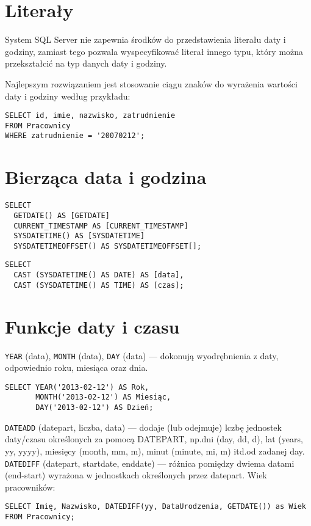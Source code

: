 \documentclass{article}
\begin{document}
\section{Literały}
System SQL Server nie zapewnia środków do przedstawienia literału daty i godziny, zamiast tego pozwala wyspecyfikować literał innego typu, który można przekształcić na typ danych daty i godziny.

Najlepszym rozwiązaniem jest stosowanie ciągu znaków do wyrażenia wartości daty i godziny według przykładu:
\begin{verbatim}
SELECT id, imie, nazwisko, zatrudnienie
FROM Pracownicy
WHERE zatrudnienie = '20070212';
\end{verbatim}

\section{Bierząca data i godzina}

\begin{verbatim}
SELECT
  GETDATE() AS [GETDATE]
  CURRENT_TIMESTAMP AS [CURRENT_TIMESTAMP]
  SYSDATETIME() AS [SYSDATETIME]
  SYSDATETIMEOFFSET() AS SYSDATETIMEOFFSET[];
\end{verbatim}
\begin{verbatim}
SELECT
  CAST (SYSDATETIME() AS DATE) AS [data],
  CAST (SYSDATETIME() AS TIME) AS [czas];
\end{verbatim}

\section{Funkcje daty i czasu}

{\tt YEAR} (data), {\tt MONTH} (data), {\tt DAY} (data) --- dokonują wyodrębnienia z daty, odpowiednio roku, miesiąca oraz dnia.

\begin{verbatim}
SELECT YEAR('2013-02-12') AS Rok,
       MONTH('2013-02-12') AS Miesiąc,
       DAY('2013-02-12') AS Dzień;
\end{verbatim}

{\tt DATEADD} (datepart, liczba, data) --- dodaje (lub odejmuje) lczbę jednostek daty/czasu określonych za pomocą DATEPART, np.\@ dni (day, dd, d), lat (years, yy, yyyy), miesięcy (month, mm, m), minut (minute, mi, m) itd.\@ od zadanej day.
{\tt DATEDIFF} (datepart, startdate, enddate) --- różnica pomiędzy dwiema datami (end-start) wyrażona w jednostkach określonych przez datepart. Wiek pracowników:
\begin{verbatim}
SELECT Imię, Nazwisko, DATEDIFF(yy, DataUrodzenia, GETDATE()) as Wiek
FROM Pracownicy;
\end{verbatim}
\end{document}
